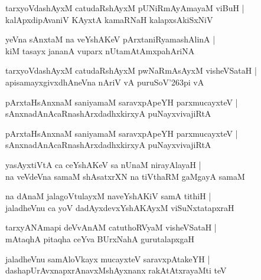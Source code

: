 \documentclass[twoside,12pt,openright]{book}
\def\S{\char'263}
\newcounter{shloka}[chapter]
\begin{document}
\begin{shloka}%
tarxyoVdashAyxM catudaRshAyxM pUNiRmAyAmayaM  viBuH |\\
kalApxdipAvaniV KAyxtA kamaRNaH kalapxsAkiSxNiV
\end{shloka}

\begin{shloka}%
yeVna sAnxtaM na veYshAKeV pArxtaniRyamashAlinA |\\
kiM tasayx jananA vuparx nUtamAtAmxpahAriNA 
\end{shloka}

\begin{shloka}%
tarxyoVdashAyxM catudaRshAyxM pwNaRmAsAyxM visheVSataH |\\
apisamayxgivxdhAneVna nAriV vA puruSoV\S pi vA 
\end{shloka}

\begin{shloka}%
pArxtaHsAnxnaM saniyamaM saravxpApeYH parxmucayxteV |\\
sAnxnadAnAcaRnashArxdadhxkirxyA puNayxvivajiRtA 
\end{shloka}

\begin{shloka}%
pArxtaHsAnxnaM saniyamaM saravxpApeYH parxmucayxteV |\\
sAnxnadAnAcaRnashArxdadhxkirxyA puNayxvivajiRtA
\end{shloka}

\begin{shloka}%
yasAyxtiVtA ca ceYshAKeV sa nUnaM nirayAlayaH |\\
na veVdeVna samaM shAsatxrXN na tiVthaRM gaMgayA samaM
\end{shloka}

\begin{shloka}%
na dAnaM jalagoVtulayxM naveYshAKiV samA tithiH |\\
jaladheVnu ca yoV dadAyxdevxYshAKAyxM viSuNxtatapxraH 
\end{shloka}

\begin{shloka}%
tarxyANAmapi deVvAnAM catuthoRVyaM visheVSataH |\\
mAtaqhA pitaqha ceYva BUrxNahA gurutalapxgaH
\end{shloka}

\begin{shloka}%
jaladheVnu samAloVkayx mucayxteV saravxpAtakeYH |\\
dashapUrAvxnapxrAnavxMshAyxnanx rakAtAtxrayaMti teV
\end{shloka}
\end{document}
